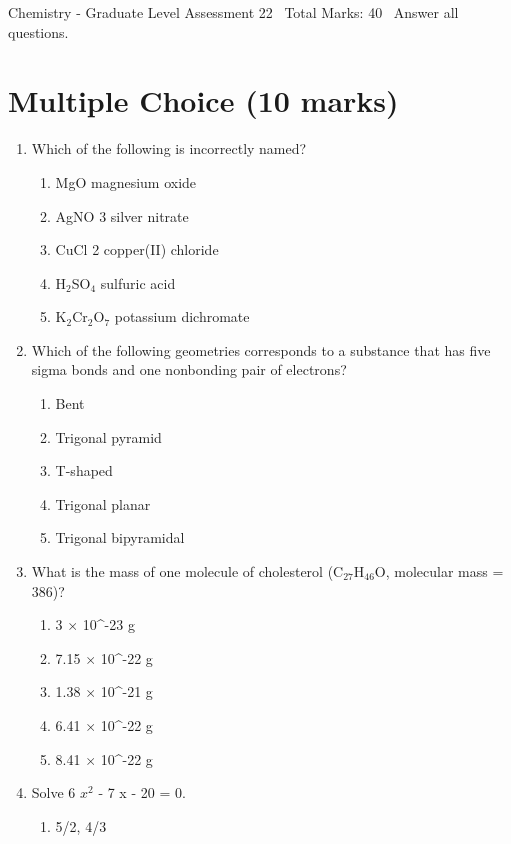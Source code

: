 \documentclass[12pt]{article}
\begin{document}
\begin{center}
Chemistry - Graduate Level Assessment 22 \
Total Marks: 40 \
Answer all questions.
\end{center}

\section*{Multiple Choice (10 marks)}
\begin{enumerate}[label=\arabic*.]
\item Which of the following is incorrectly named?
\begin{enumerate}[label=(\alph*)]
    \item MgO magnesium oxide
    \item AgNO 3 silver nitrate
    \item CuCl 2 copper(II) chloride
    \item H$_{2}$SO$_{4}$ sulfuric acid
    \item K$_{2}$Cr$_{2}$O$_{7}$ potassium dichromate
\end{enumerate}
\item Which of the following geometries corresponds to a substance that has five sigma bonds and one nonbonding pair of electrons?
\begin{enumerate}[label=(\alph*)]
    \item Bent
    \item Trigonal pyramid
    \item T-shaped
    \item Trigonal planar
    \item Trigonal bipyramidal
\end{enumerate}
\item What is the mass of one molecule of cholesterol (C$_{27}$H$_{46}$O, molecular mass = 386)?
\begin{enumerate}[label=(\alph*)]
    \item 3 \ensuremath{\times} 10^-23 g
    \item 7.15 \ensuremath{\times} 10^-22 g
    \item 1.38 \ensuremath{\times} 10^-21 g
    \item 6.41 \ensuremath{\times} 10^-22 g
    \item 8.41 \ensuremath{\times} 10^-22 g
\end{enumerate}
\item Solve 6 $x^2$ - 7 x - 20 = 0.
\begin{enumerate}[label=(\alph*)]
    \item 5/2, 4/3

\end{enumerate}
\end{enumerate}
\end{document}
